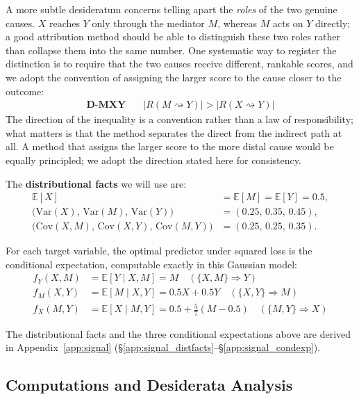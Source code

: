 \begin{example}
A more subtle desideratum concerns telling apart the \emph{roles} of the two
genuine causes. $X$ reaches $Y$ only through the mediator $M$, whereas $M$ acts
on $Y$ directly; a good attribution method should be able to distinguish these
two roles rather than collapse them into the same number. One systematic way to
register the distinction is to require that the two causes receive different,
rankable scores, and we adopt the convention of assigning the larger score to
the cause closer to the outcome:
\begin{align*}
\textbf{D-MXY} \quad & |R(M \rightsquigarrow Y)| > |R(X \rightsquigarrow Y)|
\end{align*}
\noindent The direction of the inequality is a convention rather than a law of responsibility; what matters is that the method separates the direct from the indirect path at all. A method that assigns the larger score to the more distal cause would be equally principled; we adopt the direction stated here for consistency.

\noindent The \textbf{distributional facts} we will use are:
\begin{align}
\mathbb{E}[X] &= \mathbb{E}[M] = \mathbb{E}[Y] = 0.5, \\
\bigl(\text{Var}(X),\, \text{Var}(M),\, \text{Var}(Y)\bigr) &= (0.25,\, 0.35,\, 0.45), \\
\bigl(\text{Cov}(X,M),\, \text{Cov}(X,Y),\, \text{Cov}(M,Y)\bigr) &= (0.25,\, 0.25,\, 0.35).
\end{align}

\noindent For each target variable, the optimal predictor under squared loss is the
conditional expectation, computable exactly in this Gaussian model:
\begin{align}
f_Y(X, M) &= \mathbb{E}[Y \mid X, M] = M \quad (\{X, M\} \Rightarrow Y) \\
f_M(X, Y) &= \mathbb{E}[M \mid X, Y] = 0.5X + 0.5Y \quad (\{X, Y\} \Rightarrow M) \\
f_X(M, Y) &= \mathbb{E}[X \mid M, Y] = 0.5 + \frac{5}{7}(M - 0.5) \quad (\{M, Y\} \Rightarrow X)
\end{align}

\noindent The distributional facts and the three conditional expectations above
are derived in Appendix~\ref{app:signal}
(\S\ref{app:signal_distfacts}--\S\ref{app:signal_condexp}).

\end{example}


\subsection{Computations and Desiderata Analysis}\label{sec:shap_signal}

